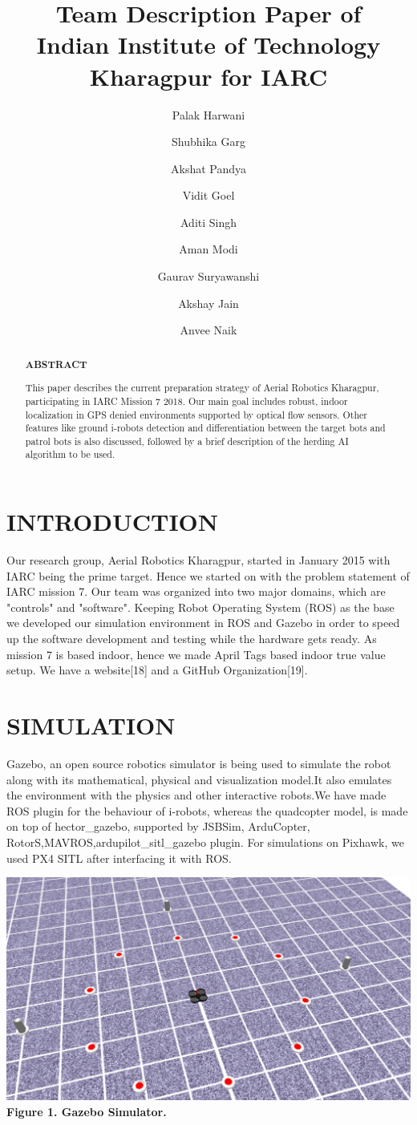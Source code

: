 \documentclass[12pt]{article}
\title{Team Description Paper of \\
Indian Institute of Technology Kharagpur for IARC}
\author[]{Palak Harwani}
\author[]{Shubhika Garg}
\author[]{Akshat Pandya}
\author[]{Vidit Goel}
\author[]{Aditi Singh}
\author[]{Aman Modi}
\author[]{Gaurav Suryawanshi}
\author[]{Akshay Jain}
\author[]{Anvee Naik}
\affil[]{Students\\ Indian Institute of Technology, Kharagpur}
\begin{document}
\maketitle
\begin{abstract}

\begin{center}\textbf{ABSTRACT}\end{center}
This paper describes the current preparation strategy of Aerial Robotics Kharagpur,
participating in IARC Mission 7 2018. Our main goal includes robust, indoor 
localization in GPS denied environments supported by optical flow sensors. 
Other features like ground i-robots detection and differentiation between the 
target bots and patrol bots is also discussed, followed by a brief description 
of the herding AI algorithm to be used.
\end{abstract}
\section{INTRODUCTION}
Our research group, Aerial Robotics Kharagpur, started in January 2015 with IARC 
being the prime target. Hence we started on with the problem statement of IARC 
mission 7. Our team was organized into two major domains, which are "controls" 
and "software". Keeping Robot Operating System (ROS) as the base we developed 
our simulation environment in ROS and Gazebo in order to speed up the software 
development and testing while the hardware gets ready. As mission 7 is based 
indoor, hence we made April Tags based indoor true value setup. We have a website[18] 
and a GitHub Organization[19].
\section{SIMULATION}
Gazebo, an open source robotics simulator is being used to simulate the robot along with its mathematical, physical and visualization model.It also emulates the environment with the physics and other interactive robots.We have made ROS plugin for the behaviour of i-robots, whereas the quadcopter model,
is made on top of hector\_gazebo, supported by JSBSim, ArduCopter, RotorS,MAVROS,ardupilot\_sitl\_gazebo plugin. For simulations on Pixhawk, we used PX4 SITL after interfacing it with ROS.
\begin{center}\includegraphics[scale=0.15]{sim} \\
\textbf{Figure 1. Gazebo Simulator.}\end{center}
\end{document}
